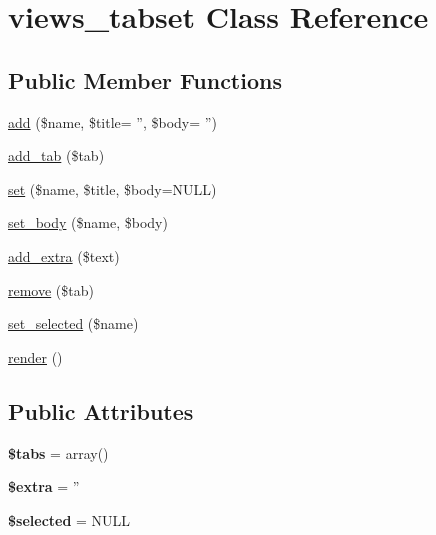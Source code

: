 \hypertarget{classviews__tabset}{
\section{views\_\-tabset Class Reference}
\label{classviews__tabset}
}
\subsection*{Public Member Functions}
\begin{CompactItemize}
\item 
\hyperlink{classviews__tabset_53c8d38fb9e23724d643b94839f3b685}{add} (\$name, \$title= '', \$body= '')
\item 
\hyperlink{classviews__tabset_ebabe797dcf1de48823d819369de57de}{add\_\-tab} (\$tab)
\item 
\hyperlink{classviews__tabset_6a74f667b324b252c1ce316df2974c66}{set} (\$name, \$title, \$body=NULL)
\item 
\hyperlink{classviews__tabset_8113b59319c48a6813e93540935fd6d6}{set\_\-body} (\$name, \$body)
\item 
\hyperlink{classviews__tabset_e7e6a38da5921084b76e30e96ac38d95}{add\_\-extra} (\$text)
\item 
\hyperlink{classviews__tabset_26ae206ad01174f0601ae90971e11071}{remove} (\$tab)
\item 
\hyperlink{classviews__tabset_2d39109f3630ad7d26ff2078ba465dea}{set\_\-selected} (\$name)
\item 
\hyperlink{classviews__tabset_9f0d471c518fe5877dd0d9ca044fa154}{render} ()
\end{CompactItemize}
\subsection*{Public Attributes}
\begin{CompactItemize}
\item 
\hypertarget{classviews__tabset_7d90e91432762069e958e011dd36df01}{
\textbf{\$tabs} = array()}
\label{classviews__tabset_7d90e91432762069e958e011dd36df01}

\item 
\hypertarget{classviews__tabset_a3500aa762b72bebc08458bc6b9364c8}{
\textbf{\$extra} = ''}
\label{classviews__tabset_a3500aa762b72bebc08458bc6b9364c8}

\item 
\hypertarget{classviews__tabset_950267e7b31ecacaf6f1049780c05164}{
\textbf{\$selected} = NULL}
\label{classviews__tabset_950267e7b31ecacaf6f1049780c05164}

\end{CompactItemize}


